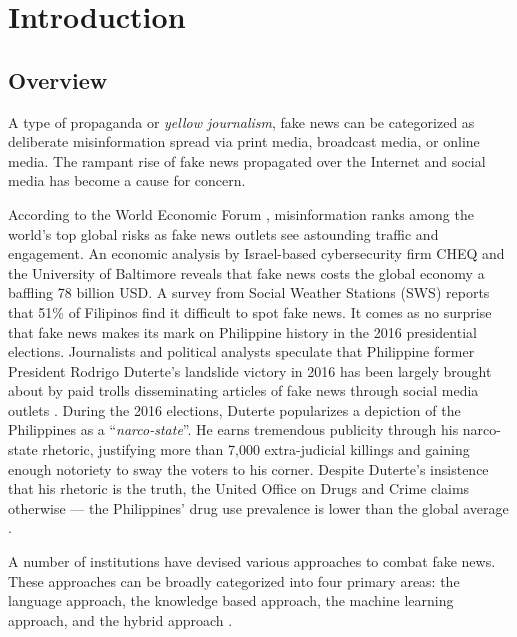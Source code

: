 \linenumbers
\chapter{Introduction}
\label{sec:researchdesc}    %

\section{Overview}
\label{sec:overview}

A type of propaganda or \textit{yellow journalism}, fake news \cite{nyt-trump-lies} can be categorized as deliberate misinformation spread via print media, broadcast media, or online media. The rampant rise of fake news propagated over the Internet and social media has become a cause for concern.

According to the World Economic Forum \cite{weforum-report}, misinformation ranks among the world's top global risks as fake news outlets see astounding traffic and engagement. An economic analysis by Israel-based cybersecurity firm CHEQ and the University of Baltimore \cite{pids-report} reveals that fake news costs the global economy a baffling 78 billion USD. A survey from Social Weather Stations (SWS) \cite{juan-felix-et-al-2023} reports that 51\% of Filipinos find it difficult to spot fake news. It comes as no surprise that fake news makes its mark on Philippine history in the 2016 presidential elections. Journalists and political analysts speculate that Philippine former President Rodrigo Duterte's landslide victory in 2016 has been largely brought about by paid trolls disseminating articles of fake news through social media outlets \cite{harvard-cyber-report}. During the 2016 elections, Duterte popularizes a depiction of the Philippines as a \enquote{\textit{narco-state}}\cite{demick2016duterte}. He earns tremendous publicity through his narco-state rhetoric, justifying more than 7,000 extra-judicial killings \cite{alconaba2016digong} and gaining enough notoriety to sway the voters to his corner. Despite Duterte's insistence that his rhetoric is the truth, the United Office on Drugs and Crime claims otherwise — the Philippines' drug use prevalence is lower than the global average \cite{yee2017posttruth}.

A number of institutions have devised various approaches to combat fake news. These approaches can be broadly categorized into four primary areas: the language approach, the knowledge based approach, the machine learning approach, and the hybrid approach \cite{debeer2020approaches}.

